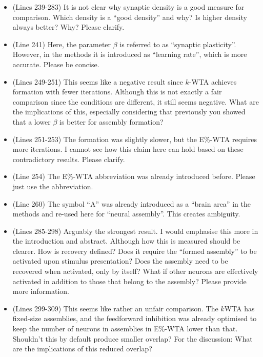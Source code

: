 \documentclass[a4paper, 11pt]{article}
\begin{document}
\begin{itemize}
    \item (Lines 239-283) It is not clear why synaptic density is a good measure for comparison. Which density is a ``good density'' and why? Is higher density always better? Why? Please clarify.
    
    \item (Line 241) Here, the parameter $\beta$ is referred to as ``synaptic plasticity''. However, in the methods it is introduced as ``learning rate'', which is more accurate. Please be concise.
    
    \item (Lines 249-251) This seems like a negative result since $k$-WTA achieves formation with fewer iterations. Although this is not exactly a fair comparison since the conditions are different, it still seems negative. What are the implications of this, especially considering that previously you showed that a lower $\beta$ is better for assembly formation?
    
    \item (Lines 251-253) The formation was slightly slower, but the E\%-WTA requires more iterations. I cannot see how this claim here can hold based on these contradictory results. Please clarify.
    
    \item (Line 254) The E\%-WTA abbreviation was already introduced before. Please just use the abbreviation.
    
    \item (Line 260) The symbol ``A'' was already introduced as a ``brain area'' in the methods and re-used here for ``neural assembly''. This creates ambiguity.
    
    \item (Lines 285-298) Arguably the strongest result. I would emphasise this more in the introduction and abstract. Although how this is measured should be clearer. How is recovery defined? Does it require the ``formed assembly'' to be activated upon stimulus presentation? Does the assembly need to be recovered when activated, only by itself? What if other neurons are effectively activated in addition to those that belong to the assembly? Please provide more information.
    
    \item (Lines 299-309) This seems like rather an unfair comparison. The $k$WTA has fixed-size assemblies, and the feedforward inhibition was already optimised to keep the number of neurons in assemblies in E\%-WTA lower than that. Shouldn't this by default produce smaller overlap? For the discussion: What are the implications of this reduced overlap?
    

\end{itemize}
\end{document}
